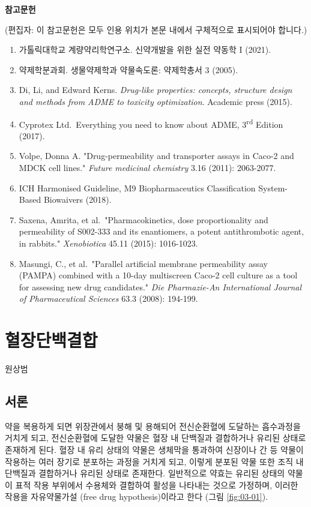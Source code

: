 \documentclass[
  11pt,
  krantz2, a4paper, twoside]{krantz}
\providecommand{\tightlist}{%
  \setlength{\itemsep}{0pt}\setlength{\parskip}{0pt}}
\begin{document}
\textbf{참고문헌}

(편집자: 이 참고문헌은 모두 인용 위치가 본문 내에서 구체적으로 표시되어야 합니다.)

\begin{enumerate}
\def\labelenumi{\arabic{enumi}.}
\tightlist
\item
  가톨릭대학교 계량약리학연구소. 신약개발을 위한 실전 약동학 I (2021).
\item
  약제학분과회. 생물약제학과 약물속도론: 약제학총서 3 (2005).
\item
  Di, Li, and Edward Kerns. \emph{Drug-like properties: concepts, structure design and methods from ADME to toxicity optimization}. Academic press (2015).
\item
  Cyprotex Ltd.~Everything you need to know about ADME, 3\textsuperscript{rd} Edition (2017).
\item
  Volpe, Donna A. "Drug-permeability and transporter assays in Caco-2 and MDCK cell lines." \emph{Future medicinal chemistry} 3.16 (2011): 2063-2077.
\item
  ICH Harmonised Guideline, M9 Biopharmaceutics Classification System-Based Biowaivers (2018).
\item
  Saxena, Amrita, et al.~"Pharmacokinetics, dose proportionality and permeability of S002-333 and its enantiomers, a potent antithrombotic agent, in rabbits." \emph{Xenobiotica} 45.11 (2015): 1016-1023.
\item
  Masungi, C., et al.~"Parallel artificial membrane permeability assay (PAMPA) combined with a 10-day multiscreen Caco-2 cell culture as a tool for assessing new drug candidates." \emph{Die Pharmazie-An International Journal of Pharmaceutical Sciences} 63.3 (2008): 194-199.
\end{enumerate}

\hypertarget{uxd608uxc7a5uxb2e8uxbc31uxacb0uxd569}{%
\chapter{혈장단백결합}\label{uxd608uxc7a5uxb2e8uxbc31uxacb0uxd569}}

\Large\hfill

원상범
\normalsize

\hypertarget{uxc11cuxb860-2}{%
\section{서론}\label{uxc11cuxb860-2}}

약을 복용하게 되면 위장관에서 붕해 및 용해되어 전신순환혈에 도달하는 흡수과정을 거치게 되고, 전신순환혈에 도달한 약물은 혈장 내 단백질과 결합하거나 유리된 상태로 존재하게 된다.
혈장 내 유리 상태의 약물은 생체막을 통과하여 신장이나 간 등 약물이 작용하는 여러 장기로 분포하는 과정을 거치게 되고, 이렇게 분포된 약물 또한 조직 내 단백질과 결합하거나 유리된 상태로 존재한다.
일반적으로 약효는 유리된 상태의 약물이 표적 작용 부위에서 수용체와 결합하여 활성을 나타내는 것으로 가정하며, 이러한 작용을 자유약물가설 (free drug hypothesis)이라고 한다 (그림 \ref{fig:03-01}).
\end{document}
